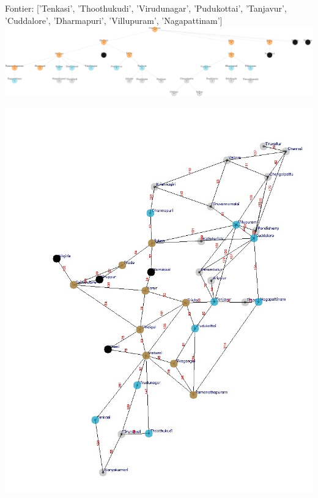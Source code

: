 \documentclass[xcolor=table]{beamer}
\begin{document}
\begin{frame}
  { \tiny Fontier: ['Tenkasi', 'Thoothukudi', 'Virudunagar', 'Pudukottai', 'Tanjavur', 'Cuddalore', 'Dharmapuri', 'Villupuram', 'Nagapattinam']}
  \includegraphics[width=1\textwidth]{../BFSNodes/19-1.png}
  \begin{center}
    \includegraphics[height=0.55\textheight]{../BFSoutput/tamilBFS17.jpg}
  \end{center}
\end{frame}
\end{document}
